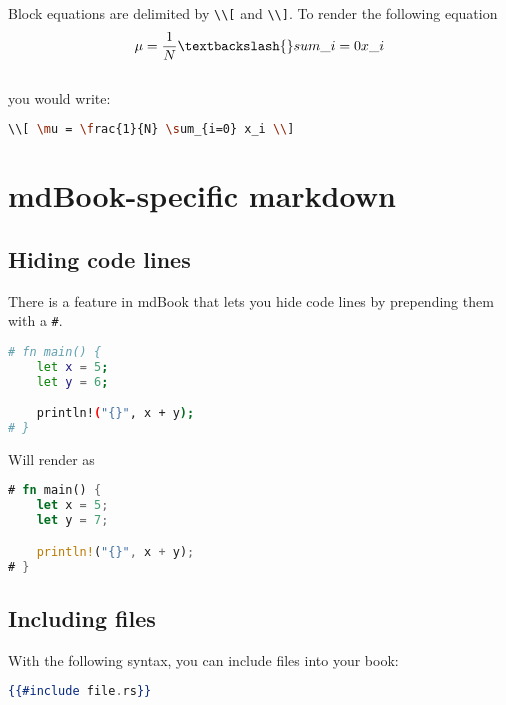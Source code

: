 \documentclass{article}
\begin{document}
Block equations are delimited by \lstinline|\\[| and \lstinline|\\]|. To render the following
equation\\

\[ \mu = \frac{1}{N} \textbackslash{}sum\_{i=0} x\_i \]\\

you would write:\\
\begin{lstlisting}[language=bash]
\\[ \mu = \frac{1}{N} \sum_{i=0} x_i \\]

\end{lstlisting}

\section{mdBook-specific markdown}
\label{mdBook-specific markdown}
\label{md-book-specific-markdown}

\subsection{Hiding code lines}
\label{Hiding code lines}
\label{hiding-code-lines}

There is a feature in mdBook that lets you hide code lines by prepending them
with a \lstinline|#|.\\
\begin{lstlisting}[language=bash]
# fn main() {
    let x = 5;
    let y = 6;

    println!("{}", x + y);
# }

\end{lstlisting}

Will render as\\
\begin{lstlisting}[language=rust]
# fn main() {
    let x = 5;
    let y = 7;

    println!("{}", x + y);
# }

\end{lstlisting}

\subsection{Including files}
\label{Including files}
\label{including-files}

With the following syntax, you can include files into your book:\\
\begin{lstlisting}[language=hbs]
{{#include file.rs}}

\end{lstlisting}
\end{document}
